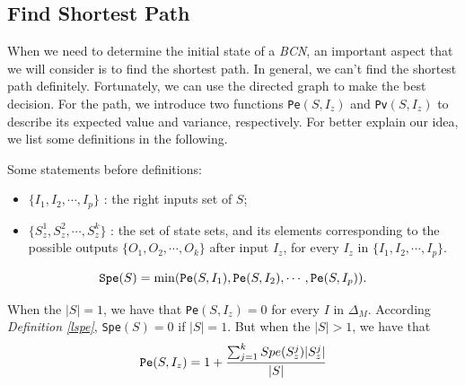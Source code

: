 \subsection{Find Shortest Path}
When we need to determine the initial state of a {\em BCN}, an important aspect that we will consider is to find the shortest path. In general, we can't find the shortest path definitely.  Fortunately, we can use the directed graph to make the best decision. For the path, we introduce two functions {\tt Pe}$(S, I_z)$ and {\tt Pv}$(S, I_z)$ to describe its expected value and variance, respectively. For better explain our idea, we list some definitions in the following.


Some statements before definitions:
\begin{itemize}
  \item $\{I_1,I_2,\cdots, I_p\}$ : the right inputs set of $S$;
  \item $\{S_z^1,S_z^2,\cdots, S_z^k\}$ : the set of state sets, and its elements corresponding to the possible outputs $\{O_1,O_2,\cdots,O_k\}$ after input $I_z$, for every $I_z$ in $\{I_1,I_2,\cdots, I_p\}$.
\end{itemize} 
\begin{definition}[{\tt Spe}$(S)$] \label{lspe}
 \[{\tt Spe}(S)= \min({\tt Pe}(S, I_1),{\tt Pe}(S, I_2),\cdots,{\tt Pe}(S, I_p)).\] 
\end{definition}

\begin{definition}[{\tt Pe}$(S, I_z)$] 
When the $|S|=1$, we have that
{\tt Pe}$(S, I_z)=0$  for every $I$ in $\Delta_M$. According {\em Definition \ref{lspe}}, {\tt Spe}$(S)=0$ if $|S|=1$. But when the $|S|>1$, 
we have that  
\[{\tt Pe}(S, I_z)=1 +\frac{\sum_{j=1}^k Spe(S_z^j)|S_z^j|}{ |S|}\] 
\end{definition}

